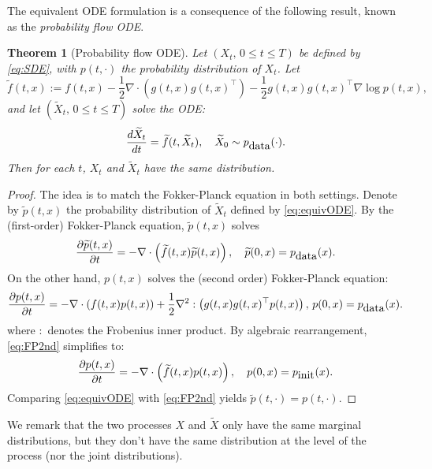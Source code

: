 \documentclass[letterpaper,11pt,reqno]{amsart}
\newtheorem{theorem}{Theorem}[section]
\numberwithin{equation}{section}
\begin{document}
\quad The equivalent ODE formulation is a consequence of the following result,
known as the {\em probability flow ODE}.
\begin{theorem}[Probability flow ODE]
\label{thm:pfODE}
Let $(X_t, \, 0 \le t \le T)$ be defined by \eqref{eq:SDE},
with $p(t, \cdot)$ the probability distribution of $X_t$.
Let 
\begin{equation}
\widetilde{f}(t,x):= f(t,x) - \frac{1}{2} \nabla \cdot (g(t,x)g(t,x)^\top) - \frac{1}{2} g(t,x) g(t,x)^\top \nabla \log p (t,x),
\end{equation}
and let $(\widetilde{X}_t, \,  0\le t \le T)$ solve the ODE:
\begin{equation}
\label{eq:equivODE}
\frac{d\widetilde{X}_t}{dt} = \widetilde{f}(t, \widetilde{X}_t), \quad \widetilde{X}_0 \sim p_{\tiny \mbox{data}}(\cdot).
\end{equation}
Then for each $t$, $X_t$ and $\widetilde{X}_t$ have the same distribution. 
\end{theorem}
\begin{proof}
The idea is to match the Fokker-Planck equation in both settings. 
Denote by $\widetilde{p}(t,x)$ the probability distribution of $\widetilde{X}_t$ defined by \eqref{eq:equivODE}.
By the (first-order) Fokker-Planck equation, $\widetilde{p}(t,x)$ solves
\begin{equation}
\frac{\partial \widetilde{p}(t,x)}{\partial t}
= -\nabla \cdot \left(\widetilde{f}(t,x) \widetilde{p}(t,x) \right), \quad \widetilde{p}(0,x) = p_{\tiny \mbox{data}}(x).
\end{equation}
On the other hand, $p(t,x)$ solves the (second order) Fokker-Planck equation:
\begin{equation}
\label{eq:FP2nd}
\frac{\partial p(t,x)}{\partial t} = - \nabla \cdot \left( f(t,x) p(t,x)\right) + 
\frac{1}{2} \nabla^2 : \left(g(t,x) g(t,x)^\top p(t,x) \right), \, p(0, x) = p_{\tiny \mbox{data}}(x).
\end{equation}
where $:$ denotes the Frobenius inner product. 
By algebraic rearrangement, \eqref{eq:FP2nd} simplifies to:
\begin{equation}
\label{eq:FP2nd2}
\frac{\partial p(t,x)}{\partial t} = - \nabla \cdot \left( \widetilde{f}(t,x) p(t,x)\right),
\quad p(0, x) = p_{\tiny \mbox{init}}(x).
\end{equation}
Comparing \eqref{eq:equivODE} with \eqref{eq:FP2nd} yields $\widetilde{p}(t, \cdot) = p(t,\cdot)$.
\end{proof}

\quad We remark that the two processes $X$ and $\widetilde{X}$ only have the same marginal distributions,
but they don't have the same distribution at the level of the process (nor the joint distributions).
\end{document}
